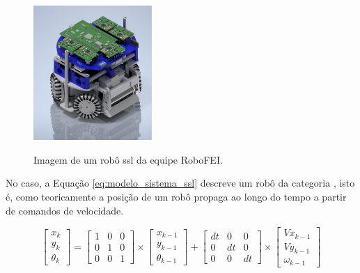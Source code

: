 \documentclass[acronym, symbols, table]{fei}
\begin{document}
		\begin{figure}[!htb]
			\centering
			\caption{Imagem de um robô \acrshort{ssl} da equipe RoboFEI.} 
			\includegraphics[width=0.4\textwidth]{Foto_Robo_2012.jpg}
			\label{fig:exemplo_robo_ssl}
		\end{figure}
		
		No caso, a Equação \ref{eq:modelo_sistema_ssl} descreve um robô da categoria , isto é, como teoricamente a posição de um robô propaga ao longo do tempo a partir de comandos de velocidade.
		
		\begin{equation}\label{eq:modelo_sistema_ssl}
			\begin{bmatrix}
				x_k \\
				y_k \\
				\theta_k
			\end{bmatrix} = 
			\begin{bmatrix}
				1 & 0 & 0 \\
				0 & 1 & 0 \\
				0 & 0 & 1
			\end{bmatrix} \times
			\begin{bmatrix}
				x_{k-1} \\
				y_{k-1} \\
				\theta_{k-1}
			\end{bmatrix} + 
			\begin{bmatrix}
				dt & 0 & 0 \\
				0 & dt & 0 \\
				0 & 0 & dt
			\end{bmatrix} \times
			\begin{bmatrix}
				Vx_{k-1} \\
				Vy_{k-1} \\
				\omega_{k-1}
			\end{bmatrix}
		\end{equation}
		
\end{document}

